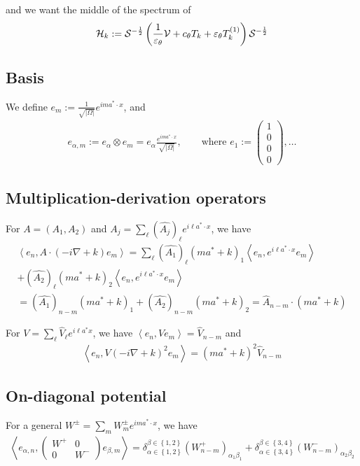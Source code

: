 \documentclass[11pt,a4paper,reqno,french,tikz]{amsart}
\newcommand{\pa}[1]{\left( #1 \right)} %
\newcommand{\acs}[1]{\left\{ #1 \right\}} %
\newcommand{\ab}[1]{\left|#1\right|} %
\newcommand{\ps}[1]{\left< #1 \right>} %
\newcommand{\na}{\nabla} %
\newcommand{\f}[2]{\frac{#1}{#2}} %
\newcommand{\mat}[1]{\begin{pmatrix} #1 \end{pmatrix}} %
\begin{document}
and we want the middle of the spectrum of
\begin{align*}
\cH_k := \cS^{-\f 12} \pa{\f{1}{\ep_\theta} \cV + c_\theta T_k + \ep_\theta T^{(1)}_k}\cS^{-\f 12}
\end{align*}


\subsection{Basis}%
\label{sub:basis}

We define $e_m := \f{1}{\sqrt{\ab{\Omega}}} e^{i m a^* \cdot x}$, and
\begin{align*}
e_{\alpha,m} := e_\alpha \otimes e_m = e_\alpha \f{e^{ima^*\cdot x}}{\sqrt{\ab{\Omega}}}, \qquad \text{where } e_1 := \mat{1 \\ 0 \\ 0 \\ 0},\dots
\end{align*}

\subsection{Multiplication-derivation operators}%

For $A = (A_1,A_2)$ and $A_j = \sum_\ell \pa{\widehat{A_j}}_\ell e^{i \ell a^*\cdot x}$, we have
\begin{multline*}
\ps{e_n, A \cdot (-i\na +k) e_m} = \sum_{\ell} \pa{\widehat{A_1}}_\ell \pa{ma^* + k}_1\ps{e_n, e^{i\ell a^*\cdot x} e_m} \\
+ \pa{\widehat{A_2}}_\ell \pa{ma^* + k}_2\ps{e_n, e^{i\ell a^*\cdot x} e_m} \\
= \pa{\widehat{A_1}}_{n-m} \pa{ma^* + k}_1 + \pa{\widehat{A_2}}_{n-m} \pa{ma^* + k}_2 = \widehat{A}_{n-m} \cdot \pa{ma^*+k}
\end{multline*}

For $V = \sum_\ell \widehat{V}_\ell e^{i\ell a^*x}$, we have $\ps{e_n,V e_m} = \widehat{V}_{n-m}$ and
\begin{align*}
\ps{e_n,V (-i\na + k)^2 e_m} =  \pa{ma^*+k}^2\widehat{V}_{n-m}
\end{align*}
\subsection{On-diagonal potential}%
\label{sub:on_diagonal_potential}



For a general $W^\pm = \sum_m W^\pm_m e^{im a^* \cdot x}$, we have
\begin{align*}
	\ps{e_{\alpha,n},\mat{W^+ & 0 \\ 0 & W^-} e_{\beta,m}} = \delta_{\alpha \in \acs{1,2}}^{\beta \in \acs{1,2}}\pa{W^+_{n-m}}_{\alpha_1 \beta_1} + \delta_{\alpha \in \acs{3,4}}^{\beta \in \acs{3,4}}\pa{W^-_{n-m}}_{\alpha_2 \beta_2}
\end{align*}
\end{document}

